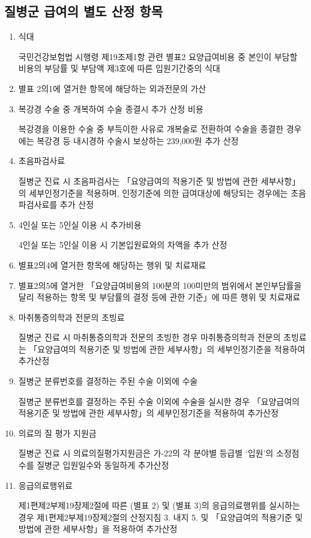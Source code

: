 \subsection{질병군 급여의 별도 산정 항목}
\begin{enumerate}[가.]\tightlist
\item 식대 \par
국민건강보험법 시행령 제19조제1항 관련 별표2 요양급여비용 중 본인이 부담할 비용의 부담률 및 부담액 제3호에 따른 입원기간중의 식대
\item 별표 2의1에 열거한 항목에 해당하는 외과전문의 가산
\item 복강경 수술 중 개복하여 수술 종결시 추가 산정 비용 \par
복강경을 이용한 수술 중 부득이한 사유로 개복술로 전환하여 수술을 종결한 경우에는 복강경 등 내시경하 수술시 보상하는 239,000원 추가 산정
\item 초음파검사료\par
질병군 진료 시 초음파검사는 「요양급여의 적용기준 및 방법에 관한 세부사항」의 세부인정기준을 적용하며, 인정기준에 의한 급여대상에 해당되는 경우에는 초음파검사료를 추가 산정
\item 4인실 또는 5인실 이용 시 추가비용 \par
4인실 또는 5인실 이용 시 기본입원료와의 차액을 추가 산정
\item 별표2의4에 열거한 항목에 해당하는 행위 및 치료재료
\item 별표2의5에 열거한 「요양급여비용의 100분의 100미만의 범위에서 본인부담률을 달리 적용하는 항목 및 부담률의 결정 등에 관한 기준」에 따른 행위 및 치료재료
\item 마취통증의학과 전문의 초빙료\par
질병군 진료 시 마취통증의학과 전문의 초빙한 경우 마취통증의학과 전문의 초빙료는 「요양급여의 적용기준 및 방법에 관한 세부사항」의 세부인정기준을 적용하여 추가산정
\item 질병군 분류번호를 결정하는 주된 수술 이외에 수술\par
질병군 분류번호를 결정하는 주된 수술 이외에 수술을 실시한 경우 「요양급여의 적용기준 및 방법에 관한 세부사항」의 세부인정기준을 적용하여 추가산정
\item 의료의 질 평가 지원금 \par
질병군 진료 시 의료의질평가지원금은 가-22의 각 분야별 등급별 ‘입원’의 소정점수를 질병군 입원일수와 동일하게 추가산정
\item 응급의료행위료 \par
제1편제2부제19장제2절에 따른 (별표 2) 및 (별표 3)의 응급의료행위를 실시하는 경우 제1편제2부제19장제2절의 산정지침 3. 내지 5. 및 「요양급여의 적용기준 및 방법에 관한 세부사항」을 적용하여 추가산정

\end{enumerate}
